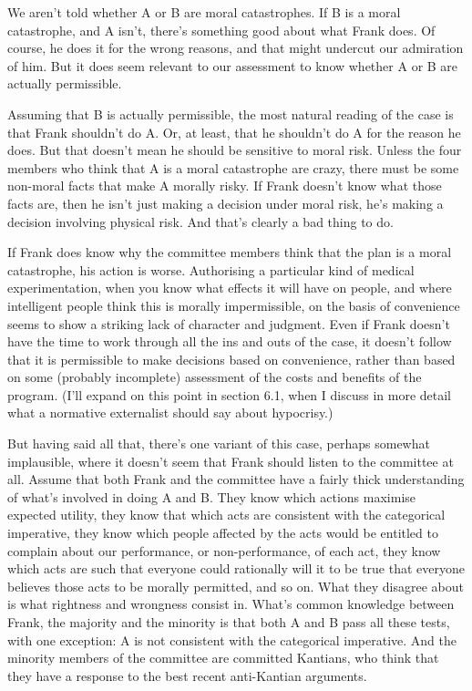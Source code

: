 \documentclass[
  10pt,
  letterpaper,
  twoside]{scrbook}
\begin{document}
We aren't told whether A or B are moral catastrophes. If B is a moral
catastrophe, and A isn't, there's something good about what {Frank}
does. Of course, he does it for the wrong reasons, and that might
undercut our admiration of him. But it does seem relevant to our
assessment to know whether A or B are actually permissible.

Assuming that B is actually permissible, the most natural reading of the
case is that {Frank} shouldn't do A. Or, at least, that he shouldn't do
A for the reason he does. But that doesn't mean he should be sensitive
to moral risk. Unless the four members who think that A is a moral
catastrophe are crazy, there must be some non-moral facts that make A
morally risky. If {Frank} doesn't know what those facts are, then he
isn't just making a decision under moral risk, he's making a decision
involving physical risk. And that's clearly a bad thing to do.

If {Frank} does know why the committee members think that the plan is a
moral catastrophe, his action is worse. Authorising a particular kind of
medical experimentation, when you know what effects it will have on
people, and where intelligent people think this is morally
impermissible, on the basis of convenience seems to show a striking lack
of character and judgment. Even if {Frank} doesn't have the time to work
through all the ins and outs of the case, it doesn't follow that it is
permissible to make decisions based on convenience, rather than based on
some (probably incomplete) assessment of the costs and benefits of the
program. (I'll expand on this point in section 6.1, when I discuss in
more detail what a normative externalist should say about hypocrisy.)

But having said all that, there's one variant of this case, perhaps
somewhat implausible, where it doesn't seem that {Frank} should listen
to the committee at all. Assume that both {Frank} and the committee have
a fairly thick understanding of what's involved in doing A and B. They
know which actions maximise expected utility, they know that which acts
are consistent with the categorical imperative, they know which people
affected by the acts would be entitled to complain about our
performance, or non-performance, of each act, they know which acts are
such that everyone could rationally will it to be true that everyone
believes those acts to be morally permitted, and so on. What they
disagree about is what rightness and wrongness consist in. What's common
knowledge between {Frank}, the majority and the minority is that both A
and B pass all these tests, with one exception: A is not consistent with
the categorical imperative. And the minority members of the committee
are committed Kantians, who think that they have a response to the best
recent anti-Kantian arguments.
\end{document}
